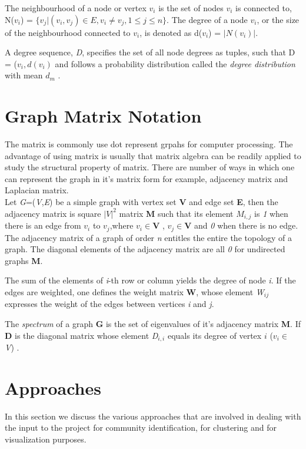 The neighbourhood of a node or vertex $v_i$ is the set of
nodes $v_i$ is connected to, N($v_i$) = $\{v_j | (v_i, v_j) \in E, v_i \neq
v_j, 1 \leq j \leq n\}$. The degree of a node $v_i$, or the size of
the neighbourhood connected to $v_i$, is denoted as d($v_i$) =
$|N(v_i)|$. 
\par A degree sequence, \textit{D}, specifies the set of all node
degrees as tuples, such that D = {($v_i, d(v_i)$} and follows a
probability distribution called the \textit{degree distribution} with
mean $d_m$ \cite{githubtest1}.

\section{Graph Matrix Notation}
The matrix is commonly use dot represent grpahs for computer processing. The advantage of using matrix is usually that matrix algebra can be readily applied to study the structural property of matrix. There are number of ways in which one can represent the graph in it's matrix form for example, adjacency matrix and Laplacian matrix. 
\\
Let \textit{G}=(\textit{V},\textit{E}) be a simple graph with vertex set \textbf{V} and edge set \textbf{E}, then the adjacency matrix is square $|V|^2$ matrix \textbf{M} such that its element $M_{i,j}$ is \textit{1} when there is an edge from $v_i$ to $v_j$,where $v_i \in \textbf{V}$ , $ v_j \in \textbf{V}$ and \textit{0} when there is no edge.
The adjacency matrix of a graph of order \textit{n} entitles the entire the topology of a graph.  The diagonal elements of the adjacency matrix are all \textit{0} for undirected graphs \textbf{M}.

\par The sum of the elements of \textit{i}-th row or column yields the degree of node \textit{i}. If the edges are weighted, one defines the weight matrix \textbf{W}, whose element \textit{W}$_{ij}$ expresses the weight of the edges between vertices \textit{i} and \textit{j}.

\par The \textit{spectrum} of a graph \textbf{G} is the set of eigenvalues of it's adjacency matrix \textbf{M}. If \textbf{D}  is the diagonal matrix whose element \textit{D}$_{i,i}$ equals its degree of vertex $i$ ($v_i \in$ \textit{V}) \cite{matrep}.

\section{Approaches}
In this section we discuss the various approaches that are involved in dealing with the input to the project for community identification, for clustering and for visualization purposes. 
